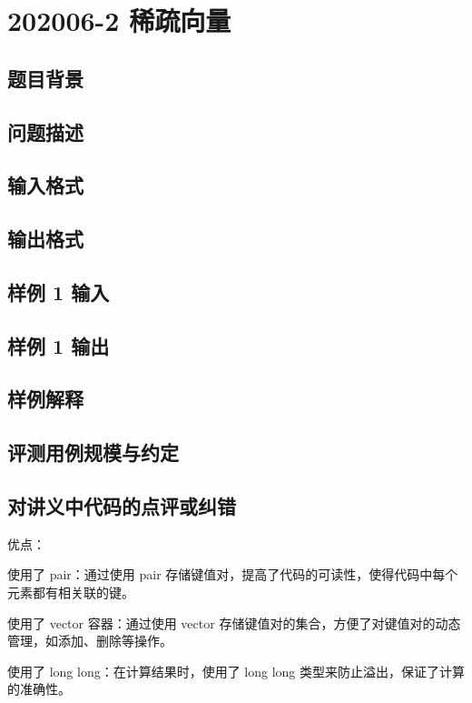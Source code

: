 \section{202006-2 稀疏向量}

\subsection{题目背景}

\subsection{问题描述}

\subsection{输入格式}

\subsection{输出格式}

\subsection{样例 1 输入}

\subsection{样例 1 输出}

\subsection{样例解释}

\subsection{评测用例规模与约定}

\subsection{对讲义中代码的点评或纠错}
 
优点：

使用了 pair：通过使用 pair 存储键值对，提高了代码的可读性，使得代码中每个元素都有相关联的键。

使用了 vector 容器：通过使用 vector 存储键值对的集合，方便了对键值对的动态管理，如添加、删除等操作。

使用了 long long：在计算结果时，使用了 long long 类型来防止溢出，保证了计算的准确性。

